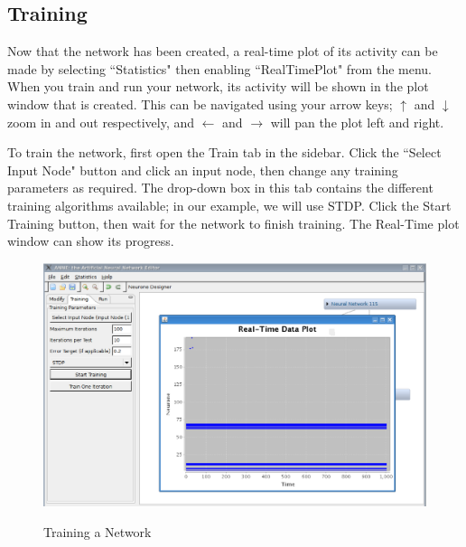 \documentclass[11pt]{report}
\begin{document}
\subsection{Training}
{
Now that the network has been created, a real{}-time plot of its activity can be made by selecting ``Statistics" then enabling ``RealTimePlot" from the menu. When you train and run your network, its activity will be shown in the plot window that is created. This can be navigated using your arrow keys; $\uparrow$ and $\downarrow$ zoom in and out respectively, and $\leftarrow$ and $\rightarrow$ will pan the plot left and right.

\noindent
To train the network, first open the Train tab in the sidebar. Click the ``Select Input Node" button and click an input node, then change any training parameters as required. The drop-down box in this tab contains the different training algorithms available; in our example, we will use STDP. Click the Start Training button, then wait for the network to finish training. The Real{}-Time plot window can show its progress.

\begin{figure}[t]
\centering
\scalebox{0.4} {
	\includegraphics{train}
}
\caption{Training a Network}
\label{fig:train}
\end{figure}
}
\newpage
\end{document}
